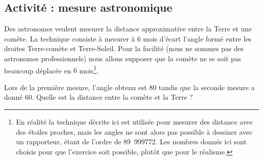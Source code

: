 
\subsection*{Activité : mesure astronomique}

Des astronomes veulent mesurer la distance approximative entre la Terre et une comète. La technique consiste à mesurer à \( 6\) mois d'écart l'angle formé entre les droites Terre-comète et Terre-Soleil. Pour la facilité (nous ne sommes pas des astronomes professionnels) nous allons supposer que la comète ne se soit pas beaucoup déplacée en \( 6\) mois\footnote{En réalité la technique décrite ici est utilisée pour mesurer des distance avec des étoiles proches, mais les angles ne sont alors pas possible à dessiner avec un rapporteur, étant de l'ordre de \unit{89.999772}{\degree}. Les nombres donnés ici sont choisis pour que l'exercice soit possible, plutôt que pour le réalisme.}.

Lors de la première mesure, l'angle obtenu est \unit{80}{\degree} tandis que la seconde mesure a donné \unit{60}{\degree}. Quelle est la distance entre la comète et la Terre ?
